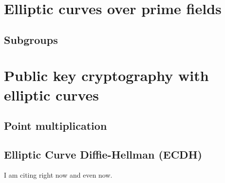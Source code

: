 \documentclass[a4paper]{article}
\begin{document}
\section{Elliptic curves over prime fields}

\subsection{Subgroups}


\section{Public key cryptography with elliptic curves}

\subsection{Point multiplication}

\subsection{Elliptic Curve Diffie-Hellman (ECDH)}

I am citing right now\cite[3-4]{greenwade93} and even now\cite[5-6]{greenwade93}.

\newpage


\end{document}
